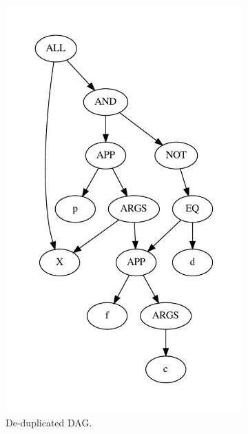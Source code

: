 \documentclass[runningheads]{llncs}
\begin{document}
\begin{figure}
\begin{subfigure}{.3\textwidth}
		\includegraphics[width=\linewidth]{translation-graph}
		\caption{De-duplicated DAG.}
	\end{subfigure}
	\begin{subfigure}{.3\textwidth}
		\centering

\end{subfigure}
\end{figure}
\end{document}
